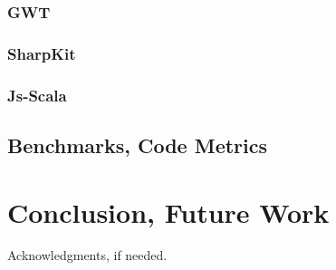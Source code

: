 \documentclass[preprint]{sigplanconf}
\begin{document}
\subsubsection{GWT}

\subsubsection{SharpKit}

\subsubsection{Js-Scala}

\subsection{Benchmarks, Code Metrics}

\section{Conclusion, Future Work}
\label{discussion}

%
%
\acks

Acknowledgments, if needed.



%
%
%
\end{document}
